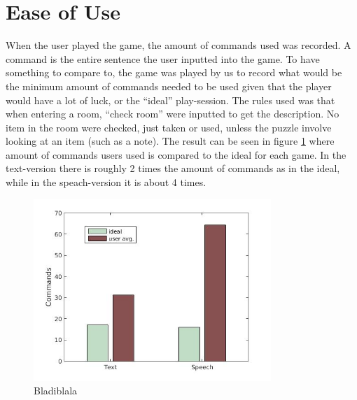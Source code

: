 \section{Ease of Use}
When the user played the game, the amount of commands used was recorded. A command is the entire sentence the user inputted into the game. To have something to compare to, the game was played by us to record what would be the minimum amount of commands needed to be used given that the player would have a lot of luck, or the ``ideal'' play-session. The rules used was that when entering a room, ``check room'' were inputted to get the description. No item in the room were checked, just taken or used, unless the puzzle involve looking at an item (such as a note). The result can be seen in figure \ref{ideal_cmd} where amount of commands users used is compared to the ideal for each game. In the text-version there is roughly 2 times the amount of commands as in the ideal, while in the speach-version it is about 4 times.

\begin{figure}[p]
  \centering
  \includegraphics[width=0.8\textwidth]{images/ideal_cmd.jpg}
  \caption{Bladiblala}\label{ideal_cmd}
\end{figure}

